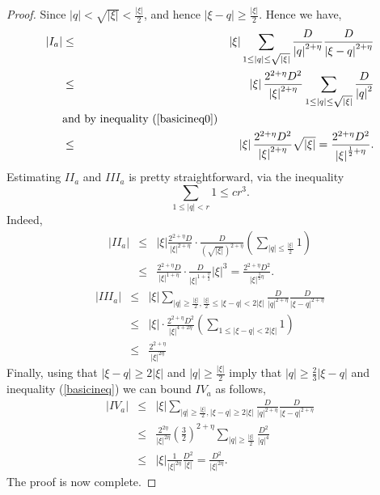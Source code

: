 \documentclass{amsart}
\begin{document}
\begin{proof}
Since $\left|q\right|<\sqrt{\left|\xi\right|}<\frac{\left|\xi\right|}{2}$, and hence
$\left|\xi-q\right|\geq \frac{\left|\xi\right|}{2}$. Hence we have,
\begin{eqnarray*}
\left|I_a\right|&\leq& \left|\xi\right|\sum_{1\leq\left|q\right|\leq\sqrt{\left|\xi\right|}}
\frac{D}{\left|q\right|^{2+\eta}}\frac{D}{\left|\xi-q\right|^{2+\eta}}\\
&\leq&\left|\xi\right|\frac{2^{2+\eta}D^2}{\left|\xi\right|^{2+\eta}}
\sum_{1\leq\left|q\right|\leq\sqrt{\left|\xi\right|}}
\frac{D}{\left|q\right|^2}\\
&\mbox{and by inequality (\ref{basicineq0})}&\\
&\leq& \left|\xi\right|\frac{2^{2+\eta}D^2}{\left|\xi\right|^{2+\eta}}\sqrt{\left|\xi\right|}=
\frac{2^{2+\eta}D^2}{\left|\xi\right|^{\frac{1}{2}+\eta}}.
\end{eqnarray*}
Estimating $II_a$ and $III_a$ is pretty straightforward, via the inequality
\begin{equation*}
\sum_{1\leq\left|q\right|<r} 1 \leq cr^3.
\end{equation*}
Indeed,
\begin{eqnarray*}
\left|II_a\right|&\leq& \left|\xi\right|\frac{2^{2+\eta}D}{\left|\xi\right|^{2+\eta}}\cdot
\frac{D}{\left(\sqrt{\left|\xi\right|}\right)^{2+\eta}}\left(\sum_{\left|q\right|\leq\frac{\left|\xi\right|}{2}}1\right)\\
&\leq&\frac{2^{2+\eta}D}{\left|\xi\right|^{1+\eta}}\cdot
\frac{D}{\left|\xi\right|^{1+\frac{\eta}{2}}}\left|\xi\right|^3=\frac{2^{2+\eta}D^2}{\left|\xi\right|^{\frac{3}{2}\eta}}.
\end{eqnarray*}
\begin{eqnarray*}
\left|III_a\right|&\leq&\left|\xi\right|
\sum_{\left|q\right|\geq \frac{\left|\xi\right|}{2},\frac{\left|\xi\right|}{2}\leq\left|\xi-q\right|<2\left|\xi\right|}
\frac{D}{\left|q\right|^{2+\eta}}\frac{D}{\left|\xi-q\right|^{2+\eta}}\\
&\leq&\left|\xi\right|\cdot\frac{2^{2+\eta}D^2}{\left|\xi\right|^{4+2\eta}}
\left(\sum_{1\leq\left|\xi-q\right|<2\left|\xi\right|}1\right)\\
&\leq&\frac{2^{2+\eta}}{\left|\xi\right|^{2\eta}}
\end{eqnarray*}
Finally, using that $\left|\xi-q\right|\geq 2\left|\xi\right|$ and $\left|q\right|\geq \frac{\left|\xi\right|}{2}$
imply that $\left|q\right|\geq \frac{2}{3}\left|\xi-q\right|$ and inequality (\ref{basicineq}) we can bound
$IV_a$ as follows,
\begin{eqnarray*}
\left|IV_a\right|&\leq&\left|\xi\right|
\sum_{\left|q\right|\geq\frac{\left|\xi\right|}{2}, \left|\xi-q\right|\geq2\left|\xi\right|}
\frac{D}{\left|q\right|^{2+\eta}}\frac{D}{\left|\xi-q\right|^{2+\eta}}\\
&\leq&
\frac{2^{2\eta}}{\left|\xi\right|^{2\eta}}\left(\frac{3}{2}\right)^{2+\eta}
\sum_{\left|q\right|\geq \frac{\left|\xi\right|}{2}}\frac{D^2}{\left|q\right|^4}\\
&\leq& \left|\xi\right|\frac{1}{\left|\xi\right|^{2\eta}}\frac{D^2}{\left|\xi\right|}=\frac{D^2}{\left|\xi\right|^{2\eta}}.
\end{eqnarray*}
The proof is now complete.
\end{proof}
\end{document}
